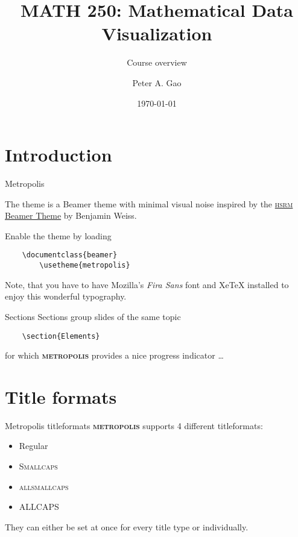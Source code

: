 \documentclass{beamer}
\title{MATH 250: Mathematical Data Visualization}
\subtitle{Course overview}
\date{\today}
\author{Peter A. Gao}
\institute{San Jos\'e State University}
\newcommand{\themename}{\textbf{\textsc{metropolis}}\xspace}
\begin{document}
\maketitle

\section[Intro]{Introduction}

\begin{frame}[fragile]{Metropolis}
	
	The theme is a Beamer theme with minimal visual noise
	inspired by the \href{https://github.com/hsrmbeamertheme/hsrmbeamertheme}{\textsc{hsrm} Beamer
		Theme} by Benjamin Weiss.
	
	Enable the theme by loading
	
	\begin{verbatim}    \documentclass{beamer}
		\usetheme{metropolis}\end{verbatim}
	
	Note, that you have to have Mozilla's \emph{Fira Sans} font and XeTeX
	installed to enjoy this wonderful typography.
\end{frame}

\begin{frame}[fragile]{Sections}
	Sections group slides of the same topic
	
	\begin{verbatim}    \section{Elements}\end{verbatim}
	
	for which \themename provides a nice progress indicator \ldots
	
\end{frame}

\section{Title formats}

\begin{frame}{Metropolis titleformats}
	\themename supports 4 different titleformats:
	\begin{itemize}
		\item Regular
		\item \textsc{Smallcaps}
		\item \textsc{allsmallcaps}
		\item ALLCAPS
	\end{itemize}
	They can either be set at once for every title type or individually.
\end{frame}
\end{document}
